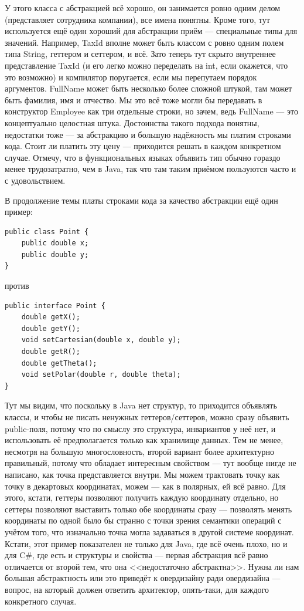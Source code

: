 \documentclass[a5paper]{article}
\begin{document}
У этого класса с абстракцией всё хорошо, он занимается ровно одним делом (представляет сотрудника компании), все имена понятны. Кроме того, тут используется ещё один хороший для абстракции приём --- специальные типы для значений. Например, TaxId вполне может быть классом с ровно одним полем типа String, геттером и сеттером, и всё. Зато теперь тут скрыто внутреннее представление TaxId (и его легко можно переделать на int, если окажется, что это возможно) и компилятор поругается, если мы перепутаем порядок аргументов. FullName может быть несколько более сложной штукой, там может быть фамилия, имя и отчество. Мы это всё тоже могли бы передавать в конструктор Employee как три отдельные строки, но зачем, ведь FullName --- это концептуально целостная штука. Достоинства такого подхода понятны, недостатки тоже --- за абстракцию и большую надёжность мы платим строками кода. Стоит ли платить эту цену --- приходится решать в каждом конкретном случае. Отмечу, что в функциональных языках объявить тип обычно гораздо менее трудозатратно, чем в Java, так что там таким приёмом пользуются часто и с удовольствием.

В продолжение темы платы строками кода за качество абстракции ещё один пример:

\begin{verbatim}
public class Point {
    public double x;
    public double y;
}
\end{verbatim}

против

\begin{verbatim}
public interface Point {
    double getX();
    double getY();
    void setCartesian(double x, double y);
    double getR();
    double getTheta();
    void setPolar(double r, double theta);
}
\end{verbatim}

Тут мы видим, что поскольку в Java нет структур, то приходится объявлять классы, и чтобы не писать ненужных геттеров/сеттеров, можно сразу объявить public-поля, потому что по смыслу это структура, инвариантов у неё нет, и использовать её предполагается только как хранилище данных. Тем не менее, несмотря на большую многословность, второй вариант более архитектурно правильный, потому что обладает интересным свойством --- тут вообще нигде не написано, как точка представляется внутри. Мы можем трактовать точку как точку в декартовых координатах, можем --- как в полярных, ей всё равно. Для этого, кстати, геттеры позволяют получить каждую координату отдельно, но сеттеры позволяют выставить только обе координаты сразу --- позволять менять координаты по одной было бы странно с точки зрения семантики операций с учётом того, что изначально точка могла задаваться в другой системе координат. Кстати, этот пример показателен не только для Java, где всё очень плохо, но и для C\#, где есть и структуры и свойства --- первая абстракция всё равно отличается от второй тем, что она <<недостаточно абстрактна>>. Нужна ли нам большая абстрактность или это приведёт к овердизайну ради овердизайна --- вопрос, на который должен ответить архитектор, опять-таки, для каждого конкретного случая.
\end{document}
